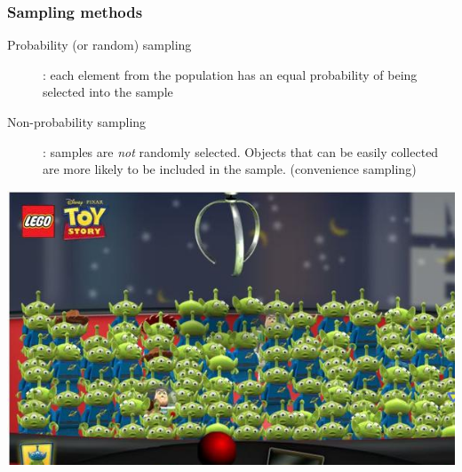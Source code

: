 \documentclass{beamer}
\begin{document}
\begin{frame}
  \frametitle{Sampling methods}

  \begin{description}
    \item[Probability (or random) sampling]: each element from the population has an equal probability of being selected into the sample
    \item[Non-probability sampling]: 
    samples are \textit{not} randomly selected. Objects that can be easily collected are more likely to be included in the sample. (convenience sampling)
  \end{description}

  \begin{center}
    \includegraphics[width=.5\textwidth]{img/les4-aselect}
  \end{center}
\end{frame}
\end{document}
